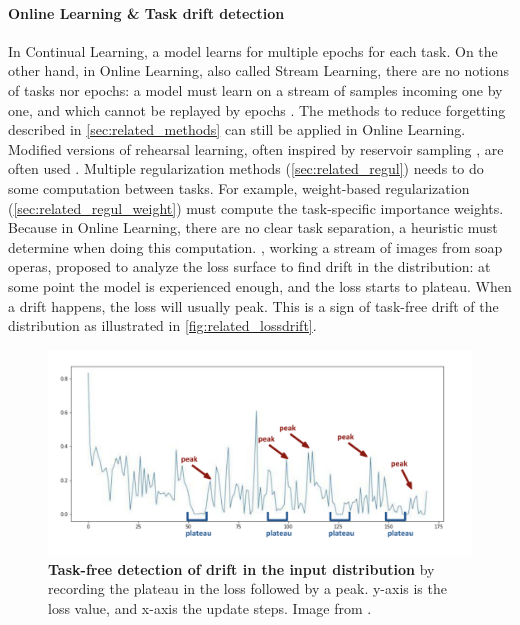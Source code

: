 \paragraph{Online Learning \& Task drift detection} In Continual Learning, a model learns for
multiple epochs for each task. On the other hand, in Online Learning, also called Stream Learning,
there are no notions of tasks nor epochs: a model must learn on a stream of samples incoming one by
one, and which cannot be replayed by epochs \citep{aljundi2019notaskboundaries}. The methods to
reduce forgetting described in \autoref{sec:related_methods} can still be applied in Online
Learning. Modified versions of rehearsal learning, often inspired by reservoir sampling
\citep{knuth97tacpvol2}, are often used \citep{hayes2019exstream,aljundi2019taskfree}. Multiple
regularization methods (\autoref{sec:related_regul}) needs to do some computation between tasks. For
example, weight-based regularization (\autoref{sec:related_regul_weight}) must compute the
task-specific importance weights. Because in Online Learning, there are no clear task separation, a
heuristic must determine when doing this computation. \citet{aljundi2019taskfree}, working a stream
of images from soap operas, proposed to analyze the loss surface to find drift in the distribution:
at some point the model is experienced enough, and the loss starts to plateau. When a drift happens,
the loss will usually peak. This is a sign of task-free drift of the distribution as illustrated in
\autoref{fig:related_lossdrift}.


\begin{figure}[tb]
    \begin{center}
        \includegraphics[width=0.6\linewidth]{images/related/loss_drift.png}
    \end{center}
    \caption{\textbf{Task-free detection of drift in the input distribution} by recording the
        plateau in the loss followed by a peak. y-axis is the loss value, and x-axis the update
        steps. Image from \citet{aljundi2019taskfree}.}
    \label{fig:related_lossdrift}
\end{figure}


